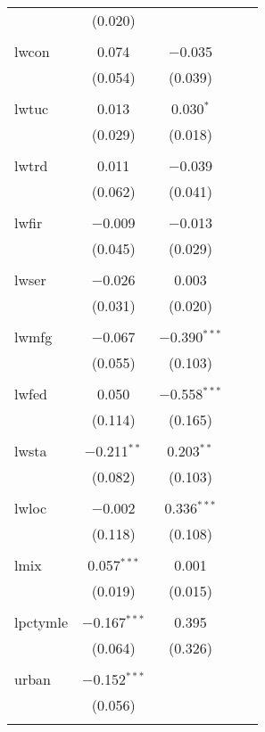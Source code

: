 \begin{tabular}{@{\extracolsep{5pt}}lcccc}
  & (0.020) &  &  &  \\ 
  & & & & \\ 
 lwcon & 0.074 & $-$0.035 &  &  \\ 
  & (0.054) & (0.039) &  &  \\ 
  & & & & \\ 
 lwtuc & 0.013 & 0.030$^{*}$ &  &  \\ 
  & (0.029) & (0.018) &  &  \\ 
  & & & & \\ 
 lwtrd & 0.011 & $-$0.039 &  &  \\ 
  & (0.062) & (0.041) &  &  \\ 
  & & & & \\ 
 lwfir & $-$0.009 & $-$0.013 &  &  \\ 
  & (0.045) & (0.029) &  &  \\ 
  & & & & \\ 
 lwser & $-$0.026 & 0.003 &  &  \\ 
  & (0.031) & (0.020) &  &  \\ 
  & & & & \\ 
 lwmfg & $-$0.067 & $-$0.390$^{***}$ &  &  \\ 
  & (0.055) & (0.103) &  &  \\ 
  & & & & \\ 
 lwfed & 0.050 & $-$0.558$^{***}$ &  &  \\ 
  & (0.114) & (0.165) &  &  \\ 
  & & & & \\ 
 lwsta & $-$0.211$^{**}$ & 0.203$^{**}$ &  &  \\ 
  & (0.082) & (0.103) &  &  \\ 
  & & & & \\ 
 lwloc & $-$0.002 & 0.336$^{***}$ &  &  \\ 
  & (0.118) & (0.108) &  &  \\ 
  & & & & \\ 
 lmix & 0.057$^{***}$ & 0.001 &  &  \\ 
  & (0.019) & (0.015) &  &  \\ 
  & & & & \\ 
 lpctymle & $-$0.167$^{***}$ & 0.395 &  &  \\ 
  & (0.064) & (0.326) &  &  \\ 
  & & & & \\ 
 urban & $-$0.152$^{***}$ &  &  &  \\ 
  & (0.056) &  &  &  \\ 
  & & & & \\ 

\end{tabular}
